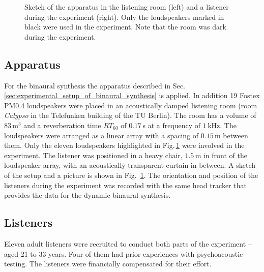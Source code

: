 \begin{figure}[t]
    \caption{Sketch of the apparatus in the listening room (left) and a listener
    during the experiment (right). Only the loudspeakers marked in black were
    used in the experiment. Note that the room was dark during
    the experiment.
    }
    \label{fig:apparatus}
\end{figure}

\subsection{Apparatus}
%
For the binaural synthesis the apparatus described in
Sec.\,\ref{sec:experimental_setup_of_binaural_synthesis} is applied.
In addition 19 Fostex {\small PM0.4}
loudspeakers were placed in an acoustically damped
listening room (room \emph{Calypso} in the Telefunken building of the {\small TU} Berlin).
The room has a volume of $83$\,m$^3$ and a reverberation time $RT_{60}$ of $0.17$\,s
at a frequency of $1$\,kHz.
The loudspeakers were arranged as a linear array with a spacing of $0.15$\,m
between them. Only the eleven loudspeakers highlighted in
Fig.\,\ref{fig:apparatus} were involved in the experiment.
The listener was positioned in a heavy chair,
$1.5$\,m in front of the
loudspeaker array, with an acoustically transparent curtain in between.
A sketch of the setup and a picture is shown in Fig.~\ref{fig:apparatus}.
The orientation and position of the listeners during the experiment was recorded
with the same head tracker that provides the data for the dynamic binaural synthesis.

\subsection{Listeners}
%
Eleven adult listeners were recruited to conduct both parts of the experiment
-- aged 21 to 33 years.
Four of them had prior experiences with psychoacoustic testing.
The listeners were financially compensated for their effort.

